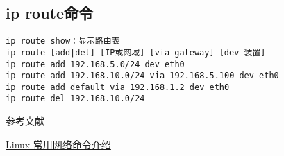 \documentclass[a4paper,left=1.5cm,right=1.5cm,11pt]{article}
\def\hang{\hangindent\parindent}
\def\textindent#1{\indent\llap{#1\enspace}\ignorespaces}
\def\re{\par\hang\textindent}
\begin{document}
\subsection{ip route命令}
\begin{lstlisting}
ip route show：显示路由表
ip route [add|del] [IP或网域] [via gateway] [dev 装置]
ip route add 192.168.5.0/24 dev eth0
ip route add 192.168.10.0/24 via 192.168.5.100 dev eth0
ip route add default via 192.168.1.2 dev eth0
ip route del 192.168.10.0/24
\end{lstlisting}
\clearpage
\begin{center}%
参考文献
\end{center}
\re{[1]} \href{http://cn.linux.vbird.org/linux_server/0140networkcommand/0140networkcommand-centos4.php}{Linux 常用网络命令介绍} 
\end{document}
